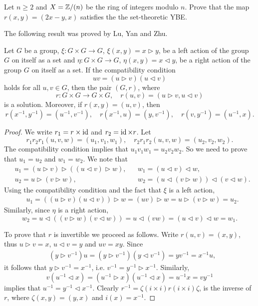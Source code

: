 \begin{example}
Let $n\geq2$ and $X=\mathbb{Z}/(n)$ be the ring of integers modulo $n$. Prove that
the map $r(x,y)=(2x-y,x)$ satisfies the the set-theoretic YBE.  
\end{example}

The following result
was proved by Lu, Yan and Zhu. 

\begin{theorem}
\label{thm:LYZ}
Let $G$ be a group, $\xi\colon G\times G\to G$, $\xi(x,y)=x\rhd y$,
be a left action of the group $G$ on itself as a set and 
$\eta\colon G\times G\to G$, $\eta(x,y)=x\lhd y$, 
be a right action of the group $G$ on itself as a set. If the compatibility condition
\[
uv=(u\rhd v)(u\lhd v)
\]
holds for all $u,v\in G$, then the pair $(G,r)$, where 
\[
r\colon G\times G\to G\times G,\quad
r(u,v)=(u\rhd v,u\lhd v)
\]
is a solution. Moreover, 
if $r(x,y)=(u,v)$, then 
\[
r(x^{-1},y^{-1})=(u^{-1},v^{-1}),
\quad
r(x^{-1},u)=(y,v^{-1}),
\quad
r(v,y^{-1})=(u^{-1},x).
\]
\end{theorem}

\begin{proof}
We write $r_1=r\times\operatorname{id}$ and $r_2=\operatorname{id}\times r$. Let
\[
r_1r_2r_1(u,v,w)=(u_1,v_1,w_1),\quad
r_2r_1r_2(u,v,w)=(u_2,v_2,w_2).
\]
The compatibility condition implies that $u_1v_1w_1=u_2v_2w_2$. 
So we need to prove that $u_1=u_2$ and $w_1=w_2$. We note that
\begin{align*}
&u_1=(u\rhd v)\rhd ( (u\lhd v)\rhd w),
&&w_1=(u\lhd v)\lhd w,\\
&u_2=u\rhd (v\rhd w),
&&w_2=(u\lhd (v\rhd w))\lhd (v\lhd w).
\end{align*}
Using the compatibility condition and the fact that $\xi$ is a left action, 
\begin{align*}
    &u_1=((u\rhd v)(u\lhd v))\rhd w=(uv)\rhd w=u\rhd (v\rhd w)=u_2.
\end{align*}
Similarly, since $\eta$ is a right action, 
\[
w_2=u\lhd ((v\rhd w)(v\lhd w))=u\lhd (vw)=(u\lhd v)\lhd w=w_1.
\]

To prove that $r$ is invertible we proceed as follows. 
Write $r(u,v)=(x,y)$, thus $u\rhd v=x$, $u\lhd v=y$ and $uv=xy$. Since 
\begin{align*}
& (y\rhd v^{-1})u=(y\rhd v^{-1})(y\lhd v^{-1})=yv^{-1}=x^{-1}u,
\end{align*}
it follows that $y\rhd v^{-1}=x^{-1}$, i.e. $v^{-1}=y^{-1}\rhd x^{-1}$. Similarly, 
\[
v(u^{-1}\lhd x)=(u^{-1}\rhd x)(u^{-1}\lhd x)=u^{-1}x=vy^{-1}
\]
implies that $u^{-1}=y^{-1}\lhd x^{-1}$. Clearly 
$r^{-1}=\zeta (i\times i) r (i\times i) \zeta$,
is the inverse of $r$, where $\zeta(x,y)=(y,x)$ and $i(x)=x^{-1}$. 
\end{proof}

